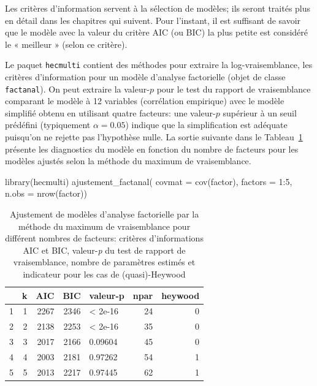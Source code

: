 \documentclass[
  11pt,
  letterpaper,
]{scrbook}
\newenvironment{Shaded}{\begin{snugshade}}{\end{snugshade}}
\newcommand{\AttributeTok}[1]{\textcolor[rgb]{0.40,0.45,0.13}{#1}}
\newcommand{\DecValTok}[1]{\textcolor[rgb]{0.68,0.00,0.00}{#1}}
\newcommand{\FunctionTok}[1]{\textcolor[rgb]{0.28,0.35,0.67}{#1}}
\newcommand{\NormalTok}[1]{\textcolor[rgb]{0.00,0.23,0.31}{#1}}
\newcommand{\SpecialCharTok}[1]{\textcolor[rgb]{0.37,0.37,0.37}{#1}}
\theoremstyle{definition}
\theoremstyle{remark}
\begin{document}
Les critères d'information servent à la sélection de modèles; ils seront
traités plus en détail dans les chapitres qui suivent. Pour l'instant,
il est suffisant de savoir que le modèle avec la valeur du critère AIC
(ou BIC) la plus petite est considéré le « meilleur » (selon ce
critère).

Le paquet \texttt{hecmulti} contient des méthodes pour extraire la
log-vraisemblance, les critères d'information pour un modèle d'analyse
factorielle (objet de classe \texttt{factanal}). On peut extraire la
valeur-\(p\) pour le test du rapport de vraisemblance comparant le
modèle à 12 variables (corrélation empirique) avec le modèle simplifié
obtenu en utilisant quatre facteurs: une valeur-\(p\) supérieur à un
seuil prédéfini (typiquement \(\alpha=0.05\)) indique que la
simplification est adéquate puisqu'on ne rejette pas l'hypothèse nulle.
La sortie suivante dans le Tableau~\ref{tbl-emvcrit} présente les
diagnostics du modèle en fonction du nombre de facteurs pour les modèles
ajustés selon la méthode du maximum de vraisemblance.

\begin{Shaded}
\begin{Highlighting}[]
\FunctionTok{library}\NormalTok{(hecmulti)}
\FunctionTok{ajustement\_factanal}\NormalTok{(}
    \AttributeTok{covmat =} \FunctionTok{cov}\NormalTok{(factor),}
    \AttributeTok{factors =} \DecValTok{1}\SpecialCharTok{:}\DecValTok{5}\NormalTok{,}
    \AttributeTok{n.obs =} \FunctionTok{nrow}\NormalTok{(factor))}
\end{Highlighting}
\end{Shaded}

\hypertarget{tbl-emvcrit}{}
\begin{table}
\caption{\label{tbl-emvcrit}Ajustement de modèles d'analyse factorielle par la méthode du maximum de
vraisemblance pour différent nombres de facteurs: critères
d'informations AIC et BIC, valeur-\emph{p} du test de rapport de
vraisemblance, nombre de paramètres estimés et indicateur pour les cas
de (quasi)-Heywood }\tabularnewline

\centering
\begin{tabular}{lrrrlrr}
\toprule
  & k & AIC & BIC & valeur-p & npar & heywood\\
\midrule
1 & 1 & 2267 & 2346 & < 2e-16 & 24 & 0\\
2 & 2 & 2138 & 2253 & < 2e-16 & 35 & 0\\
3 & 3 & 2017 & 2166 & 0.09604 & 45 & 0\\
4 & 4 & 2003 & 2181 & 0.97262 & 54 & 1\\
5 & 5 & 2013 & 2217 & 0.97445 & 62 & 1\\
\bottomrule
\end{tabular}
\end{table}
\end{document}
